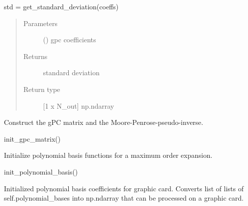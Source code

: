 \documentclass[letterpaper,10pt,english,openany,oneside]{sphinxmanual}
\begin{document}
\begin{fulllineitems}
\begin{fulllineitems}
std = get\_standard\_deviation(coeffs)
\begin{quote}\begin{description}
\item[{Parameters}] \leavevmode
{} (\sphinxstyleliteralemphasis{\sphinxupquote{ {[}}}\sphinxstyleliteralemphasis{\sphinxupquote{{]}}}) \textendash{} gpc coefficients

\item[{Returns}] \leavevmode
{} \textendash{} standard deviation

\item[{Return type}] \leavevmode
{[}1 x N\_out{]} np.ndarray

\end{description}\end{quote}

\end{fulllineitems}


\begin{fulllineitems}
\label{\detokenize{pygpc:pygpc.gpc.gPC.init_gpc_matrix}}
Construct the gPC matrix and  the Moore-Penrose-pseudo-inverse.

init\_gpc\_matrix()

\end{fulllineitems}


\begin{fulllineitems}
\label{\detokenize{pygpc:pygpc.gpc.gPC.init_polynomial_basis}}
Initialize polynomial basis functions for a maximum order expansion.

init\_polynomial\_basis()

\end{fulllineitems}


\begin{fulllineitems}
\label{\detokenize{pygpc:pygpc.gpc.gPC.init_polynomial_basis_gpu}}
Initialized polynomial basis coefficients for graphic card. Converts list of lists of self.polynomial\_bases
into np.ndarray that can be processed on a graphic card.


\end{fulllineitems}
\end{fulllineitems}
\end{document}
